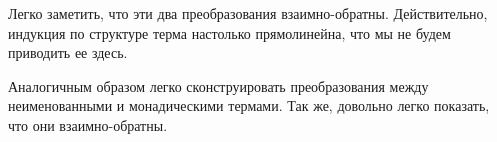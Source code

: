 Легко заметить, что эти два преобразования взаимно-обратны. Действительно, индукция по структуре терма настолько прямолинейна, что мы не будем приводить ее здесь.

Аналогичным образом легко сконструировать преобразования между неименованными и монадическими термами. Так же, довольно легко показать, что они взаимно-обратны.
